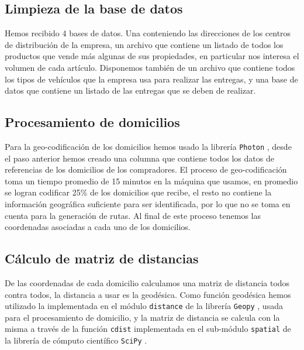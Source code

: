 \documentclass[journal]{IEEEtran}
\begin{document}
        \subsection{Limpieza de la base de datos} \label{stage 1}
            
            Hemos recibido 4 bases de datos. Una conteniendo las direcciones de los centros de distribución de la empresa, un archivo que contiene un listado de todos los productos que vende más algunas de sus propiedades, en particular nos interesa el volumen de cada artículo. Disponemos también de un archivo que contiene todos los tipos de vehículos que la empresa usa para realizar las entregas, y una base de datos que contiene un listado de las entregas que se deben de realizar.
            
        \subsection{Procesamiento de domicilios} \label{stage 2}
        
            Para la geo-codificación de los domicilios hemos usado la librería \texttt{Photon} \cite{photon}, desde el paso anterior hemos creado una columna que contiene todos los datos de referencias de los domicilios de los compradores. El proceso de geo-codificación toma un tiempo promedio de 15 minutos en la máquina que usamos, en promedio se logran codificar 25\% de los domicilios que recibe, el resto no contiene la información geográfica suficiente para ser identificada, por lo que no se toma en cuenta para la generación de rutas. Al final de este proceso tenemos las coordenadas asociadas a cada uno de los domicilios.

        \subsection{Cálculo de matriz de distancias} \label{stage 3}
            
            De las coordenadas de cada domicilio calculamos una matriz de distancia todos contra todos, la distancia a usar es la geodésica. Como función geodésica hemos utilizado la implementada en el módulo \texttt{distance} de la librería \texttt{Geopy} \cite{geopy}, usada para el procesamiento de domicilio, y la matriz de distancia se calcula con la misma a través de la función \texttt{cdist} implementada en el sub-módulo \texttt{spatial} de la librería de cómputo científico \texttt{SciPy} \cite{2020SciPy-NMeth}.
\end{document}
